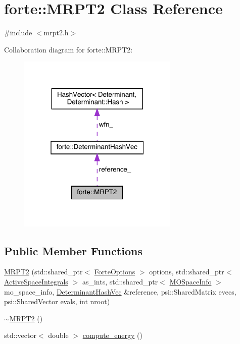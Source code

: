 \hypertarget{classforte_1_1_m_r_p_t2}{}\section{forte\+:\+:M\+R\+P\+T2 Class Reference}
\label{classforte_1_1_m_r_p_t2}


{\ttfamily \#include $<$mrpt2.\+h$>$}



Collaboration diagram for forte\+:\+:M\+R\+P\+T2\+:
\nopagebreak
\begin{figure}[H]
\begin{center}
\leavevmode
\includegraphics[width=217pt]{classforte_1_1_m_r_p_t2__coll__graph}
\end{center}
\end{figure}
\subsection*{Public Member Functions}
\begin{DoxyCompactItemize}
\item 
\mbox{\hyperlink{classforte_1_1_m_r_p_t2_a2d90725ec7359be7d44657dae00d6354}{M\+R\+P\+T2}} (std\+::shared\+\_\+ptr$<$ \mbox{\hyperlink{classforte_1_1_forte_options}{Forte\+Options}} $>$ options, std\+::shared\+\_\+ptr$<$ \mbox{\hyperlink{classforte_1_1_active_space_integrals}{Active\+Space\+Integrals}} $>$ as\+\_\+ints, std\+::shared\+\_\+ptr$<$ \mbox{\hyperlink{classforte_1_1_m_o_space_info}{M\+O\+Space\+Info}} $>$ mo\+\_\+space\+\_\+info, \mbox{\hyperlink{classforte_1_1_determinant_hash_vec}{Determinant\+Hash\+Vec}} \&reference, psi\+::\+Shared\+Matrix evecs, psi\+::\+Shared\+Vector evals, int nroot)
\item 
\mbox{\hyperlink{classforte_1_1_m_r_p_t2_a1359d7cf1e445799d7fc3f25db567971}{$\sim$\+M\+R\+P\+T2}} ()
\item 
std\+::vector$<$ double $>$ \mbox{\hyperlink{classforte_1_1_m_r_p_t2_a1d8731d0e3aaf083edd2697b94dd92f3}{compute\+\_\+energy}} ()
\end{DoxyCompactItemize}
